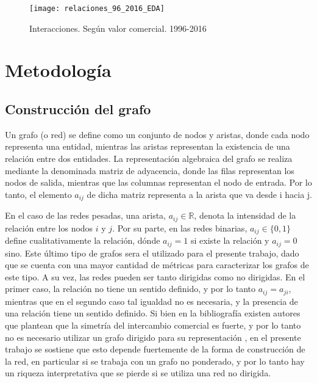\documentclass[class=article, crop=false]{standalone}
\begin{document}
\begin{figure}
	\centering	
	\texttt{[image: relaciones\_96\_2016\_EDA]}
	\caption{Interacciones. Según valor comercial. 1996-2016}
	\label{fig:hexplot}
\end{figure}


\section{Metodología}


\subsection{Construcción del grafo}

Un grafo (o red) se define como un conjunto de nodos y aristas, donde cada nodo representa una entidad, mientras las aristas representan la existencia de una relación entre dos entidades. La representación algebraica del grafo se realiza mediante la denominada matriz de adyacencia, donde las filas representan los nodos de salida, mientras que las columnas representan el nodo de entrada. Por lo tanto, el elemento $a_{ij}$ de dicha matriz representa a la arista que va desde i hacia j.

En el caso de las redes pesadas, una arista, $a_{ij} \in \mathbb{R}$, denota la intensidad de la relación entre los nodos $i$ y $j$. Por su parte, en las redes binarias, $a_{ij} \in \{0,1\}$ define cualitativamente la relación, dónde $a_{ij} = 1$ si existe la relación y $a_{ij} = 0$ sino. Este último tipo de grafos sera el utilizado para el presente trabajo, dado que se cuenta con una mayor cantidad de métricas para caracterizar los grafos de este tipo.      
A su vez, las redes pueden ser tanto dirigidas como no dirigidas. En el primer caso, la relación no tiene un sentido definido, y por lo tanto $a_{ij} = a_{ji}$, mientras que en el segundo caso tal igualdad no es necesaria, y la presencia de una relación tiene un sentido definido. Si bien en la bibliografía existen autores que plantean que la simetría del intercambio comercial es fuerte, y por lo tanto no es necesario utilizar un grafo dirigido para su representación \cite{Fagiolo2007}, en el presente trabajo se sostiene que esto depende fuertemente de la forma de construcción de la red, en particular si se trabaja con un grafo no ponderado, y por lo tanto hay un riqueza interpretativa que se pierde si se utiliza una red no dirigida.       
\end{document}
